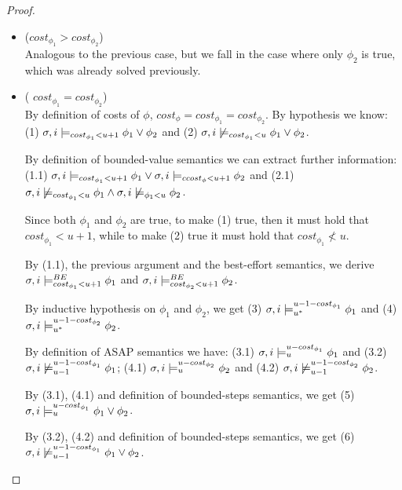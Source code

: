 \begin{theorem}
\begin{proof}
\begin{itemize}
\begin{itemize}
\begin{itemize}
            \item ($cost_{\phi_1} > cost_{\phi_2}$) \\
            Analogous to the previous case, but we fall in the case where only $\phi_2$ is true, which was already solved previously.

            \item( $cost_{\phi_1} = cost_{\phi_2}$) \\
            By definition of costs of $\phi$, $cost_\phi = cost_{\phi_1} = cost_{\phi_2}$.
            By hypothesis we know:
            (1) $\sigma,i \models_{cost_{\phi_1} < u + 1} \phi_1 \lor \phi_2$ and 
            (2) $\sigma,i \not\models_{cost_{\phi_1} < u} \phi_1 \lor \phi_2$.
            
            By definition of bounded-value semantics we can extract further information: 
            (1.1) $\sigma,i \models_{cost_{\phi_1} < u + 1} \phi_1 \lor \sigma,i \models_{ccost_\phi < u + 1} \phi_2$ and 
            (2.1) $\sigma,i \not\models_{cost_{\phi_1} < u} \phi_1 \land \sigma,i \not\models_{{\phi_1} < u} \phi_2$.

            Since both $\phi_1$ and $\phi_2$ are true, to make (1) true, then it must hold that $cost_{\phi_1} < u + 1$, while to make (2) true it must hold that $cost_{\phi_1} \not< u$.

            By (1.1), the previous argument and the best-effort semantics, we derive $\sigma,i \models_{cost_{\phi_1} < u + 1}^{BE} \phi_1$ and $\sigma,i \models_{cost_{\phi_2} < u + 1}^{BE} \phi_2$.
            
            By inductive hypothesis on $\phi_1$ and $\phi_2$, we get (3) $\sigma,i \models_{{u}^*}^{u-1-cost_{\phi_1}} \phi_1$ and (4) $\sigma,i \models_{{u}^*}^{u-1-cost_{\phi_2}} \phi_2$.

            By definition of ASAP semantics we have: (3.1) $\sigma,i \models_{u}^{u-cost_{\phi_1}} \phi_1$ and (3.2) $\sigma,i \not\models_{u-1}^{u-1-cost_{\phi_1}} \phi_1$; (4.1) $\sigma,i \models_{u}^{u-cost_{\phi_2}} \phi_2$ and (4.2) $\sigma,i \not\models_{u-1}^{u-1-cost_{\phi_2}} \phi_2$.

            By (3.1), (4.1) and definition of bounded-steps semantics, we get (5) $\sigma,i \models_{u}^{u-cost_{\phi_1}} \phi_1 \lor \phi_2$.

            By (3.2), (4.2) and definition of bounded-steps semantics, we get (6) $\sigma,i \not\models_{u-1}^{u-1-cost_{\phi_1}} \phi_1 \lor \phi_2$.
            

\end{itemize}
\end{itemize}
\end{itemize}
\end{proof}
\end{theorem}
